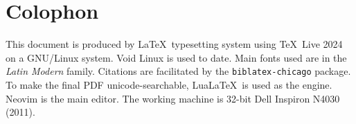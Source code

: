 \clearpage
{}
{}
\chapter*{Colophon}

This document is produced by \LaTeX\ typesetting system using \TeX\ Live 2024 on a GNU/Linux system. Void Linux is used to date. Main fonts used are in the \emph{Latin Modern} family. Citations are facilitated by the \texttt{biblatex-chicago} package. To make the final PDF unicode-searchable, Lua\LaTeX\ is used as the engine. Neovim is the main editor. The working machine is 32-bit Dell Inspiron N4030 (2011).
